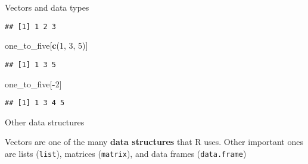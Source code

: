 \documentclass[
  11pt,
  ignorenonframetext,
]{beamer}
\newenvironment{Shaded}{\begin{snugshade}}{\end{snugshade}}
\newcommand{\DecValTok}[1]{\textcolor[rgb]{0.00,0.00,0.81}{#1}}
\newcommand{\KeywordTok}[1]{\textcolor[rgb]{0.13,0.29,0.53}{\textbf{#1}}}
\newcommand{\NormalTok}[1]{#1}
\newcommand{\OperatorTok}[1]{\textcolor[rgb]{0.81,0.36,0.00}{\textbf{#1}}}
\begin{document}
\begin{frame}[fragile]{Vectors and data types}
\begin{verbatim}
## [1] 1 2 3
\end{verbatim}

\begin{Shaded}
\begin{Highlighting}[]
\NormalTok{one_to_five[}\KeywordTok{c}\NormalTok{(}\DecValTok{1}\NormalTok{, }\DecValTok{3}\NormalTok{, }\DecValTok{5}\NormalTok{)]}
\end{Highlighting}
\end{Shaded}

\begin{verbatim}
## [1] 1 3 5
\end{verbatim}

\begin{Shaded}
\begin{Highlighting}[]
\NormalTok{one_to_five[}\OperatorTok{-}\DecValTok{2}\NormalTok{]}
\end{Highlighting}
\end{Shaded}

\begin{verbatim}
## [1] 1 3 4 5
\end{verbatim}

\end{frame}

\begin{frame}[fragile]{Other data structures}
\protect\hypertarget{other-data-structures}{}

Vectors are one of the many \textbf{data structures} that R uses. Other
important ones are lists (\texttt{list}), matrices (\texttt{matrix}),
and data frames (\texttt{data.frame})

\end{frame}
\end{document}
